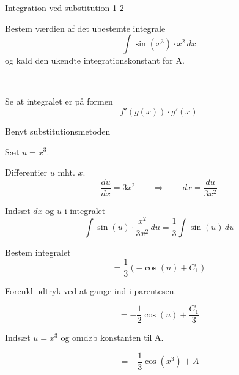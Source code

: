 \documentclass{article}
\begin{document}
\begin{exercise}{Integration ved substitution 1-2}
	
	
	Bestem værdien af det ubestemte integrale
	\[
	\int \sin(x^3) \cdot x^2 \, dx
	\]
	og kald den ukendte integrationskonstant for A.
	
	 \\
	
	
	
	\hint
	
	Se at integralet er på formen
	\[
	f'(g(x)) \cdot g'(x)
	\]
	
	\hint
	
	Benyt substitutionsmetoden
	
	\hint
	
	Sæt $u=x^3$.
	
	
	\hint
	
	Differentier $u$ mht. $x$.
	\[
	\frac{du}{dx} = 3x^2 \qquad	\Rightarrow \qquad dx = \frac{du}{3x^2}
	\]
	
	\hint
	
	Indsæt $dx$ og $u$ i integralet
	\[
	\int \sin(u) \cdot \frac{x^2}{3x^2} \, du = \frac{1}{3} \int \sin(u) \, du
	\]
	
	\hint
	
	Bestem integralet
	\[
	= \frac{1}{3} \left( -\cos(u) + C_1 \right)
	\]
	
	\hint
	Forenkl udtryk ved at gange ind i parentesen.
	
	\hint
	
	\[
	= - \frac{1}{2} \cos(u) + \frac{C_1}{3}
	\]
	
	\hint
	
	Indsæt $u = x^3$ og omdøb konstanten  til A.
	
	\hint
	
	\[
	= - \frac{1}{3} \cos(x^3) + A
	\]
	
	
\end{exercise}

\newpage
\end{document}
